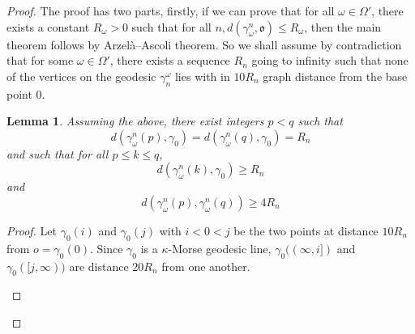 \documentclass[12 pt]{amsart}
\newcommand{\gothic}{\mathfrak}
\newcommand{\go}{{\gothic o}}
\newtheorem{lemma}[theorem]{Lemma}
\newtheorem{claim}[theorem]{Claim}
\theoremstyle{definition}
\theoremstyle{remark}
\newcommand{\ga}{{\gamma}}
\begin{document}
\begin{proof}

\newline
The proof has two parts, firstly, if we can prove that for all $\omega \in \Omega'$, there exists a constant $R_{\omega}>0$ such that for all $n, d\left(\gamma_{\omega}^{n}, \mathfrak{o}\right) \leq R_{\omega}$, then the main theorem follows by Arzelà–Ascoli theorem. So we shall assume by contradiction that for some $\omega \in \Omega'$, there exists a sequence $R_{n}$ going to infinity such that none of the vertices on the geodesic $\ga_n^\omega$ lies with in $10R_n$ graph distance from the base point $\mathfrak{0}$. 
\begin{lemma}\label{lemma38}
Assuming the above, there exist integers $p<q$ such that
\[d\left(\gamma_{\omega}^{n}(p), \gamma_{0}\right)=d\left(\gamma_{\omega}^{n}(q), \gamma_{0}\right)=R_{n}\]
and such that for all $p \leq k \leq q$,
\[
d\left(\gamma_{\omega}^{n}(k), \gamma_{0}\right) \geq R_{n}
\]and
\[
d\left(\gamma_{\omega}^{n}(p), \gamma_{\omega}^{n}(q)\right) \geq 4 R_{n}\]
\end{lemma}
\begin{proof}  Let $\gamma_{0}(i)$ and $\gamma_{0}(j)$ with $i<0<j$ be the two points at distance $10 R_{n}$ from $o=\gamma_{0}(0)$. Since $\gamma_{0}$ is a $\kappa$-Morse geodesic line, $\gamma_{0}((\infty, i])$ and $\gamma_{0}([j, \infty))$ are distance $20 R_{n}$ from one another. 

\begin{figure}
    


\begin{tikzpicture}[x=0.75pt,y=0.75pt,yscale=-1,xscale=1]


\end{tikzpicture}
\end{figure}
\end{proof}
\end{proof}
\end{document}
